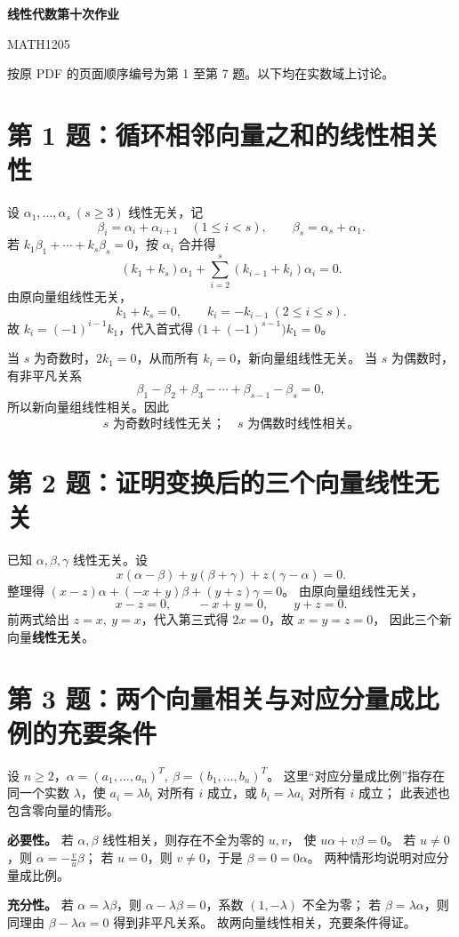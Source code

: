 \documentclass[11pt,a4paper,fontset=fandol]{ctexart}
\newcommand{\problem}[1]{\Needspace{6\baselineskip}\section*{#1}}
\newcommand{\ans}[1]{\boxed{#1}}
\begin{document}
\setlength{\abovedisplayskip}{7pt plus 2pt minus 2pt}
\setlength{\belowdisplayskip}{7pt plus 2pt minus 2pt}
\setlength{\abovedisplayshortskip}{4pt plus 1pt minus 1pt}
\setlength{\belowdisplayshortskip}{4pt plus 1pt minus 1pt}
\begin{center}
{\LARGE\bfseries 线性代数第十次作业}\par
\vspace{0.3em}
{\small MATH1205}
\end{center}
\vspace{-0.3em}
按原 PDF 的页面顺序编号为第 1 至第 7 题。以下均在实数域上讨论。

\problem{第 1 题：循环相邻向量之和的线性相关性}
设 $\alpha_1,\ldots,\alpha_s\ (s\ge3)$ 线性无关，记
\[
\beta_i=\alpha_i+\alpha_{i+1}\quad(1\le i<s),\qquad
\beta_s=\alpha_s+\alpha_1.
\]
若 $k_1\beta_1+\cdots+k_s\beta_s=0$，按 $\alpha_i$ 合并得
\[
(k_1+k_s)\alpha_1+\sum_{i=2}^{s}(k_{i-1}+k_i)\alpha_i=0.
\]
由原向量组线性无关，
\[
k_1+k_s=0,\qquad k_i=-k_{i-1}\ (2\le i\le s).
\]
故 $k_i=(-1)^{i-1}k_1$，代入首式得
$\bigl(1+(-1)^{s-1}\bigr)k_1=0$。

当 $s$ 为奇数时，$2k_1=0$，从而所有 $k_i=0$，新向量组线性无关。
当 $s$ 为偶数时，有非平凡关系
\[
\beta_1-\beta_2+\beta_3-\cdots+\beta_{s-1}-\beta_s=0,
\]
所以新向量组线性相关。因此
\[
\ans{s\text{ 为奇数时线性无关；}\quad s\text{ 为偶数时线性相关。}}
\]

\problem{第 2 题：证明变换后的三个向量线性无关}
已知 $\alpha,\beta,\gamma$ 线性无关。设
\[
x(\alpha-\beta)+y(\beta+\gamma)+z(\gamma-\alpha)=0.
\]
整理得 $(x-z)\alpha+(-x+y)\beta+(y+z)\gamma=0$。
由原向量组线性无关，
\[
x-z=0,\qquad -x+y=0,\qquad y+z=0.
\]
前两式给出 $z=x,\ y=x$，代入第三式得 $2x=0$，故 $x=y=z=0$，
因此三个新向量\textbf{线性无关}。

\problem{第 3 题：两个向量相关与对应分量成比例的充要条件}
设 $n\ge2$，$\alpha=(a_1,\ldots,a_n)^T,\ \beta=(b_1,\ldots,b_n)^T$。
这里“对应分量成比例”指存在同一个实数 $\lambda$，使
$a_i=\lambda b_i$ 对所有 $i$ 成立，或 $b_i=\lambda a_i$ 对所有 $i$ 成立；
此表述也包含零向量的情形。

\textbf{必要性。} 若 $\alpha,\beta$ 线性相关，则存在不全为零的 $u,v$，
使 $u\alpha+v\beta=0$。
若 $u\ne0$，则 $\alpha=-\frac vu\beta$；
若 $u=0$，则 $v\ne0$，于是 $\beta=0=0\alpha$。
两种情形均说明对应分量成比例。

\textbf{充分性。} 若 $\alpha=\lambda\beta$，则
$\alpha-\lambda\beta=0$，系数 $(1,-\lambda)$ 不全为零；
若 $\beta=\lambda\alpha$，则同理由 $\beta-\lambda\alpha=0$ 得到非平凡关系。
故两向量线性相关，充要条件得证。
\end{document}
